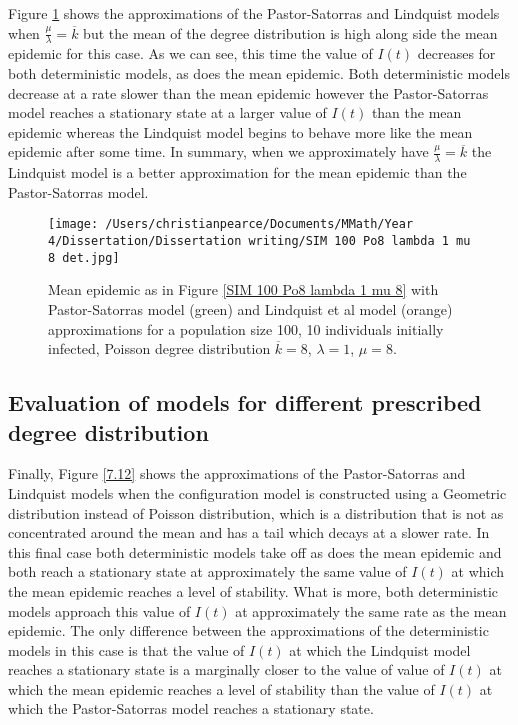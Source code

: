 \documentclass{uonmathsreport}
\begin{document}
Figure \ref{7.11} shows the approximations of the Pastor-Satorras and Lindquist models when $\frac{\mu}{\lambda}=\overline{k}$ but the mean of the degree distribution is high along side the mean epidemic for this case. As we can see, this time the value of $I(t)$ decreases for both deterministic models, as does the mean epidemic. Both deterministic models decrease at a rate slower than the mean epidemic however the Pastor-Satorras model reaches a stationary state at a larger value of $I(t)$ than the mean epidemic whereas the Lindquist model begins to behave more like the mean epidemic after some time. In summary, when we approximately have $\frac{\mu}{\lambda}=\overline{k}$ the Lindquist model is a better approximation for the mean epidemic than the Pastor-Satorras model.

\begin{figure}
\begin{center}
\texttt{[image: /Users/christianpearce/Documents/MMath/Year 4/Dissertation/Dissertation writing/SIM 100 Po8 lambda 1 mu 8 det.jpg]}
\end{center}
\caption{Mean epidemic as in Figure \ref{SIM 100 Po8 lambda 1 mu 8} with Pastor-Satorras model (green) and Lindquist et al model (orange) approximations for a population size 100, 10 individuals initially infected, Poisson degree distribution $\overline{k}=8$, $\lambda=1$, $\mu=8$.}
\label{7.11}
\end{figure}

\subsection{Evaluation of models for different prescribed degree distribution} \label{subsec:7.5}

Finally, Figure \ref{7.12} shows the approximations of the Pastor-Satorras and Lindquist models when the configuration model is constructed using a Geometric distribution instead of Poisson distribution, which is a distribution that is not as concentrated around the mean and has a tail which decays at a slower rate. In this final case both deterministic models take off as does the mean epidemic and both reach a stationary state at approximately the same value of $I(t)$ at which the mean epidemic reaches a level of stability. What is more, both deterministic models approach this value of $I(t)$ at approximately the same rate as the mean epidemic. The only difference between the approximations of the deterministic models in this case is that the value of $I(t)$ at which the Lindquist model reaches a stationary state is a marginally closer to the value of value of $I(t)$ at which the mean epidemic reaches a level of stability than the value of $I(t)$ at which the Pastor-Satorras model reaches a stationary state. 
\end{document}
